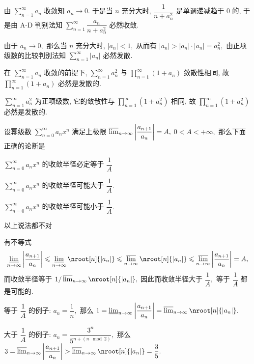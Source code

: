\begin{solution}
由 $\displaystyle \sum_{n=1}^{\infty} a_n$ 收敛知 $a_n \to 0.$ 于是当 $n$ 充分大时, $\displaystyle \dfrac{1}{n + a_n^2}$ 是单调递减趋于 $0$ 的, 于是由 A-D 判别法知 $\displaystyle \sum_{n=1}^{\infty} \dfrac{a_n}{n + a_n^2}$ 必然收敛.

由于 $a_n \to 0,$ 那么当 $n$ 充分大时, $|a_n| < 1,$ 从而有 $|a_n| > |a_n| \cdot |a_n| = a_n^2,$ 由正项级数的比较判别法知 $\displaystyle \sum_{n=1}^{\infty} |a_n|$ 必然发散.

在 $\displaystyle \sum_{n=1}^{\infty} a_n$ 收敛的前提下, $\displaystyle \sum_{n=1}^{\infty} a_n^2$ 与 $\displaystyle \prod_{n=1}^{\infty} (1 + a_n)$ 敛散性相同, 故 $\displaystyle \prod_{n=1}^{\infty} (1 + a_n)$ 必然是发散的.

$\displaystyle \sum_{n=1}^{\infty} a_n^2$ 为正项级数, 它的敛散性与 $\displaystyle \prod_{n=1}^{\infty} (1 + a_n^2)$ 相同, 故 $\displaystyle \prod_{n=1}^{\infty} (1 + a_n^2)$ 必然是发散的.
\end{solution}

\begin{question}
设幂级数 $\sum\limits_{n=0}^\infty a_n x^n$ 满足上极限 $\varlimsup_{n\to\infty} \left\lvert \dfrac{a_{n+1}}{a_n} \right\rvert = A,$ $0 < A < +\infty,$ 那么下面正确的论断是 \paren[B]

\begin{choices}
\item $\sum\limits_{n=0}^\infty a_n x^n$ 的收敛半径必定等于 $\dfrac{1}{A}$
\item $\sum\limits_{n=0}^\infty a_n x^n$ 的收敛半径可能大于 $\dfrac{1}{A}.$
\item $\sum\limits_{n=0}^\infty a_n x^n$ 的收敛半径可能小于 $\dfrac{1}{A}.$
\item 以上说法都不对
\end{choices}
\end{question}

\begin{solution}
有不等式
\[\varliminf_{n\to\infty} \left\lvert \dfrac{a_{n+1}}{a_n} \right\rvert \leqslant \varliminf_{n\to\infty} \nroot[n]{\lvert a_n \rvert} \leqslant \varlimsup_{n\to\infty} \nroot[n]{\lvert a_n \rvert} \leqslant \varlimsup_{n\to\infty}  \left\lvert \dfrac{a_{n+1}}{a_n} \right\rvert = A,\]
而收敛半径等于 $1 / \varlimsup_{n\to\infty} \nroot[n]{\lvert a_n \rvert},$ 因此而收敛半径大于 $\dfrac{1}{A},$ 等于 $\dfrac{1}{A}$ 都是可能的.

等于 $\dfrac{1}{A}$ 的例子: $a_n = \dfrac{1}{n},$ 那么 $1 = \varliminf_{n\to\infty} \left\lvert \dfrac{a_{n+1}}{a_n} \right\rvert = \varlimsup_{n\to\infty} \nroot[n]{\lvert a_n \rvert}.$

大于 $\dfrac{1}{A}$ 的例子: $a_n = \dfrac{3^{n}}{5^{n + (n \mod 2)}},$ 那么 $3 = \varlimsup_{n\to\infty} \left\lvert \dfrac{a_{n+1}}{a_n} \right\rvert > \varlimsup_{n\to\infty} \nroot[n]{\lvert a_n \rvert} = \dfrac{3}{5}.$
\end{solution}


